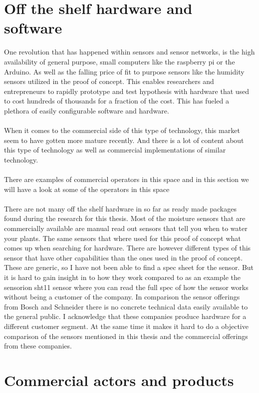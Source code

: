 \documentclass[]{uiophd}
\begin{document}
\section{Off the shelf hardware and software}
One revolution that has happened within sensors and sensor networks, is the high availability of general purpose, small computers like the raspberry pi or the Arduino. As well as the falling price of fit to purpose sensors like the humidity sensors utilized in the proof of concept. This enables researchers and entrepreneurs to rapidly prototype and test hypothesis with hardware that used to cost hundreds of thousands for a fraction of the cost. This has fueled a plethora of easily configurable software and hardware.
\\\\
When it comes to the commercial side of this type of technology, this market seem to have gotten more mature recently. And there is a lot of content about this type of technology as well as commercial implementations of similar technology.
\\\\
There are examples of commercial operators in this space and in this section we will have a look at some of the operators in this space
\\\\
There are not many off the shelf hardware in so far as ready made packages  found during the research for this thesis. Most of the moisture sensors that are commercially available are manual read out sensors that tell you when to water your plants. The same sensors that where used for this proof of concept what comes up when searching for hardware. There are however different types of this sensor that have other capabilities than the ones used in the proof of concept. These are generic, so I have not been able to find a spec sheet for the sensor. But it is hard to gain insight in to how they work compared to as an example the sensorion sht11 sensor \cite{sensorion} where you can read the full spec of how the sensor works without being a customer of the company. In comparison the sensor offerings from Bosch and Schneider there is no concrete technical data easily available to the general public. I acknowledge that these companies produce hardware for a different customer segment. At the same time it makes it hard to do a objective comparison of the sensors mentioned in this thesis and the commercial offerings from these companies.

\section{Commercial actors and products}
\end{document}
